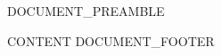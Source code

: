 {{DOCUMENT_PREAMBLE}}
\usepackage{fancyhdr}
\pagestyle{fancy}
\fancyhf{}
\renewcommand{\headrulewidth}{0.4pt}
\renewcommand{\footrulewidth}{0pt}
\fancyhead[R]{\small\textcolor{examblue}{\today}}
\fancyfoot[C]{\small\thepage}


\sloppy
{{CONTENT}}
{{DOCUMENT_FOOTER}}

